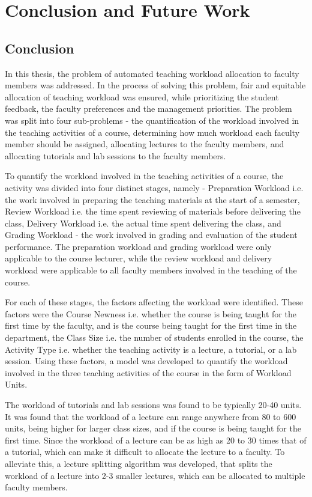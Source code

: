 \chapter{Conclusion and Future Work}

\section{Conclusion}

In this thesis, the problem of automated teaching workload allocation to faculty members was addressed. In the process of solving this problem, fair and equitable allocation of teaching workload was ensured, while prioritizing the student feedback, the faculty preferences and the management priorities. The problem was split into four sub-problems - the quantification of the workload involved in the teaching activities of a course, determining how much workload each faculty member should be assigned, allocating lectures to the faculty members, and allocating tutorials and lab sessions to the faculty members.

To quantify the workload involved in the teaching activities of a course, the activity was divided into four distinct stages, namely - Preparation Workload i.e. the work involved in preparing the teaching materials at the start of a semester, Review Workload i.e. the time spent reviewing of materials before delivering the class, Delivery Workload i.e. the actual time spent delivering the class, and Grading Workload - the work involved in grading and evaluation of the student performance. The preparation workload and grading workload were only applicable to the course lecturer, while the review workload and delivery workload were applicable to all faculty members involved in the teaching of the course.

For each of these stages, the factors affecting the workload were identified. These factors were the Course Newness i.e. whether the course is being taught for the first time by the faculty, and is the course being taught for the first time in the department, the Class Size i.e. the number of students enrolled in the course, the Activity Type i.e. whether the teaching activity is a lecture, a tutorial, or a lab session. Using these factors, a model was developed to quantify the workload involved in the three teaching activities of the course in the form of Workload Units.

The workload of tutorials and lab sessions was found to be typically 20-40 units. It was found that the workload of a lecture can range anywhere from 80 to 600 units, being higher for larger class sizes, and if the course is being taught for the first time. Since the workload of a lecture can be as high as 20 to 30 times that of a tutorial, which can make it difficult to allocate the lecture to a faculty. To alleviate this, a lecture splitting algorithm was developed, that splits the workload of a lecture into 2-3 smaller lectures, which can be allocated to multiple faculty members.

